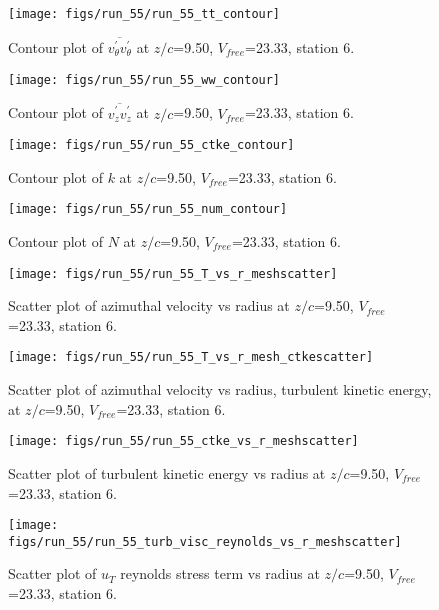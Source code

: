 \begin{figure}[H]
\centering
\texttt{[image: figs/run\_55/run\_55\_tt\_contour]}
\caption{Contour plot of $\overline{v_{\theta}^{\prime} v_{\theta}^{\prime}}$ at $z/c$=9.50, $V_{free}$=23.33, station 6.}
\end{figure}


\begin{figure}[H]
\centering
\texttt{[image: figs/run\_55/run\_55\_ww\_contour]}
\caption{Contour plot of $\overline{v_{z}^{\prime} v_{z}^{\prime}}$ at $z/c$=9.50, $V_{free}$=23.33, station 6.}
\end{figure}


\begin{figure}[H]
\centering
\texttt{[image: figs/run\_55/run\_55\_ctke\_contour]}
\caption{Contour plot of $k$ at $z/c$=9.50, $V_{free}$=23.33, station 6.}
\end{figure}


\begin{figure}[H]
\centering
\texttt{[image: figs/run\_55/run\_55\_num\_contour]}
\caption{Contour plot of $N$ at $z/c$=9.50, $V_{free}$=23.33, station 6.}
\end{figure}


\begin{figure}[H]
\centering
\texttt{[image: figs/run\_55/run\_55\_T\_vs\_r\_meshscatter]}
\caption{Scatter plot of azimuthal velocity vs radius at $z/c$=9.50, $V_{free}$=23.33, station 6.}
\end{figure}


\begin{figure}[H]
\centering
\texttt{[image: figs/run\_55/run\_55\_T\_vs\_r\_mesh\_ctkescatter]}
\caption{Scatter plot of azimuthal velocity vs radius, turbulent kinetic energy, at $z/c$=9.50, $V_{free}$=23.33, station 6.}
\end{figure}


\begin{figure}[H]
\centering
\texttt{[image: figs/run\_55/run\_55\_ctke\_vs\_r\_meshscatter]}
\caption{Scatter plot of turbulent kinetic energy vs radius at $z/c$=9.50, $V_{free}$=23.33, station 6.}
\end{figure}


\begin{figure}[H]
\centering
\texttt{[image: figs/run\_55/run\_55\_turb\_visc\_reynolds\_vs\_r\_meshscatter]}
\caption{Scatter plot of $
u_T$ reynolds stress term vs radius at $z/c$=9.50, $V_{free}$=23.33, station 6.}
\end{figure}



